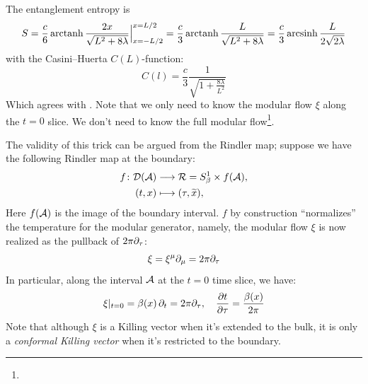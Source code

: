 \documentclass[11pt,a4paper,utf8]{article}
\renewcommand{\tilde}[1]{\ensuremath{\widetilde{#1}}}
\begin{document}
	The entanglement entropy is
	\begin{equation}
	S=\frac{c}{6}\operatorname{arctanh}\frac{2x}{\sqrt{L^2 + 8\lambda}}\Big|_{x=-L/2}^{x=L/2}
	=\frac{c}{3}\operatorname{arctanh}\frac{L}{\sqrt{L^2 + 8\lambda}}
	=\frac{c}{3}\operatorname{arcsinh}\frac{L}{2\sqrt{2\lambda}}
	\end{equation}
	with the Casini--Huerta $C(L)$-function:
	\begin{equation}
	C(l)=\frac{c}{3}\frac{1}{\sqrt{1+\frac{8\lambda}{L^2}}}
	\end{equation}
	Which agrees with \cite{Lewkowycz:2019xse}. 
	Note that we only need to know the modular flow $\xi$ along the $t = 0$ slice. We don't need to know the full modular flow\footnote{
	}. 
	
	The validity of this trick can be argued from the Rindler map; suppose we have the following Rindler map at the boundary:
	\begin{equation}
	\begin{aligned}
		f\colon
		\mcal{D}(\mcal{A})
		&\longto \mcal{R} = S^1_\beta \times f(\mcal{A}), \\
		(t,x)
		&\longmapsto (\tau,\tilde{x}),
	\end{aligned}
	\end{equation}
	Here $f(\mathcal{A})$ is the image of the boundary interval. $f$ by construction ``normalizes'' the temperature for the modular generator, namely, the modular flow $\xi$ is now realized as the pullback of $2\pi\partial_{\tau}$:
	\begin{equation}
		\xi = \xi^\mu \partial_{\mu}
		= 2\pi\partial_{\tau}
	\end{equation}
	In particular, along the interval $\mathcal{A}$ at the $t = 0$ time slice, we have:
	\begin{equation}
		\xi|_{t = 0}
		= \beta(x)\,\partial_{t}
		= 2\pi\partial_{\tau},
	\quad
		\frac{\partial{t}}{\partial{\tau}}
		= \frac{\beta(x)}{2\pi}
	\end{equation}
	Note that although $\xi$ is a Killing vector when it's extended to the bulk, it is only a \textit{conformal Killing vector} when it's restricted to the boundary. 
	
\end{document}
